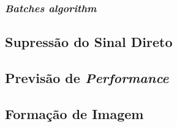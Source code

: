 \subsubsection*{\textit{Batches algorithm}}





\subsection{Supressão do Sinal Direto}




\subsection{Previsão de \textit{Performance}}



\subsection{Formação de Imagem}


